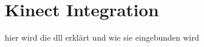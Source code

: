 \chapter{Kinect Integration}
\begin{Spacing}{\mylinespace}
hier wird die dll erklärt und wie sie eingebunden wird\\
\end{Spacing}
\newpage
\clearpage
